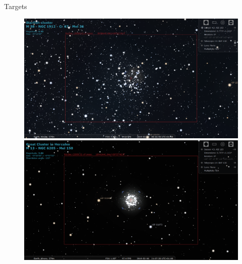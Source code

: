 \documentclass[11pt, aspectratio=169]{beamer}
\begin{document}
\begin{frame}{Targets}
\begin{figure}[!htb]
\begin{minipage}[t]{.42\textwidth}
        \includegraphics[width=\linewidth]{figures/targets/Starfish.png}
    \end{minipage}%
    \begin{minipage}[t]{.42\textwidth}
        \centering
        \includegraphics[width=\linewidth]{figures/targets/Hercules.png}
    \end{minipage}%
\end{figure}
\end{frame}
\end{document}
